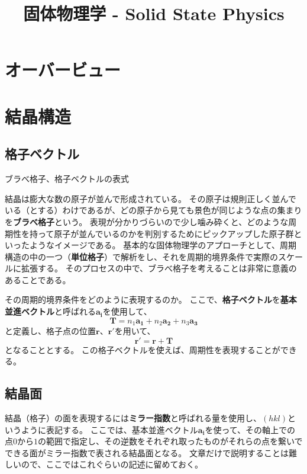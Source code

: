 \documentclass[a4paper]{jsreport}
\title{固体物理学 - Solid State Physics}
\begin{document}
    \maketitle

    \tableofcontents

    \chapter{オーバービュー}
    \chapter{結晶構造}
        \section{格子ベクトル}
            ブラべ格子、格子ベクトルの表式\par
            結晶は膨大な数の原子が並んで形成されている。
            その原子は規則正しく並んでいる（とする）わけであるが、どの原子から見ても景色が同じような点の集まりを\textbf{ブラべ格子}という。
            表現が分かりづらいので少し噛み砕くと、どのような周期性を持って原子が並んでいるのかを判別するためにピックアップした原子群といったようなイメージである。
            基本的な固体物理学のアプローチとして、周期構造の中の一つ（\textbf{単位格子}）で解析をし、それを周期的境界条件で実際のスケールに拡張する。
            そのプロセスの中で、ブラべ格子を考えることは非常に意義のあることである。\par
            その周期的境界条件をどのように表現するのか。
            ここで、\textbf{格子ベクトル}を\textbf{基本並進ベクトル}と呼ばれる$\boldsymbol{a_i}$を使用して、
            \begin{equation} \label{eq:21a}
                \boldsymbol{T} = n_1 \boldsymbol{a_1} + n_2 \boldsymbol{a_2} + n_3 \boldsymbol{a_3}
            \end{equation}
            と定義し、格子点の位置$\boldsymbol{r}$、$\boldsymbol{r'}$を用いて、
            \begin{equation}
                \boldsymbol{r'} = \boldsymbol{r} + \boldsymbol{T}
            \end{equation}
            となることとする。
            この格子ベクトルを使えば、周期性を表現することができる。

        \section{結晶面}
            結晶（格子）の面を表現するには\textbf{ミラー指数}と呼ばれる量を使用し、$(hkl)$というように表記する。
            ここでは、基本並進ベクトル$\boldsymbol{a_i}$を使って、その軸上での点$0$から$1$の範囲で指定し、その逆数をそれぞれ取ったものがそれらの点を繋いでできる面がミラー指数で表される結晶面となる。
            文章だけで説明することは難しいので、ここではこれぐらいの記述に留めておく。
\end{document}
